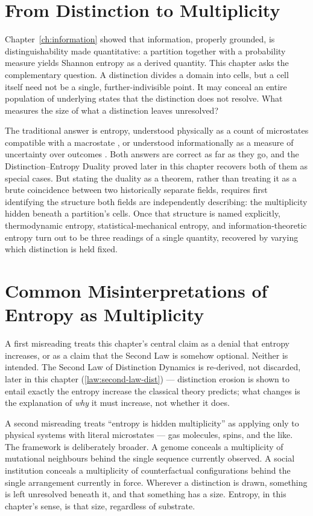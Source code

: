 \documentclass[12pt,twoside,openright]{book}
\begin{document}
\section{From Distinction to Multiplicity}
\label{sec:ch3-from-distinction}

Chapter~\ref{ch:information} showed that information,
properly grounded, is distinguishability made quantitative:
a partition together with a probability measure yields
Shannon entropy as a derived quantity. This chapter asks the
complementary question. A distinction divides a domain into
cells, but a cell itself need not be a single,
further-indivisible point. It may conceal an entire
population of underlying states that the distinction does
not resolve. What measures the size of what a distinction
leaves unresolved?

The traditional answer is entropy, understood physically as
a count of microstates compatible with a macrostate
\parencite{boltzmann1877,gibbs1902}, or understood
informationally as a measure of uncertainty over outcomes
\parencite{jaynes1957}. Both answers are correct as far as
they go, and the Distinction--Entropy Duality proved later
in this chapter recovers both of them as special cases. But
stating the duality as a theorem, rather than treating it as
a brute coincidence between two historically separate
fields, requires first identifying the structure both fields
are independently describing: the multiplicity hidden
beneath a partition's cells. Once that structure is named
explicitly, thermodynamic entropy, statistical-mechanical
entropy, and information-theoretic entropy turn out to be
three readings of a single quantity, recovered by varying
which distinction is held fixed.

\section{Common Misinterpretations of Entropy as
  Multiplicity}
\label{sec:ch3-misinterpretations}

A first misreading treats this chapter's central claim as a
denial that entropy increases, or as a claim that the Second
Law is somehow optional. Neither is intended. The Second Law
of Distinction Dynamics is re-derived, not discarded, later
in this chapter (\cref{law:second-law-dist}) --- distinction
erosion is shown to entail exactly the entropy increase the
classical theory predicts; what changes is the explanation of
\emph{why} it must increase, not whether it does.

A second misreading treats ``entropy is hidden multiplicity''
as applying only to physical systems with literal microstates
--- gas molecules, spins, and the like. The framework is
deliberately broader. A genome conceals a multiplicity of
mutational neighbours behind the single sequence currently
observed. A social institution conceals a multiplicity of
counterfactual configurations behind the single arrangement
currently in force. Wherever a distinction is drawn, something
is left unresolved beneath it, and that something has a size.
Entropy, in this chapter's sense, is that size, regardless of
substrate.
\end{document}
